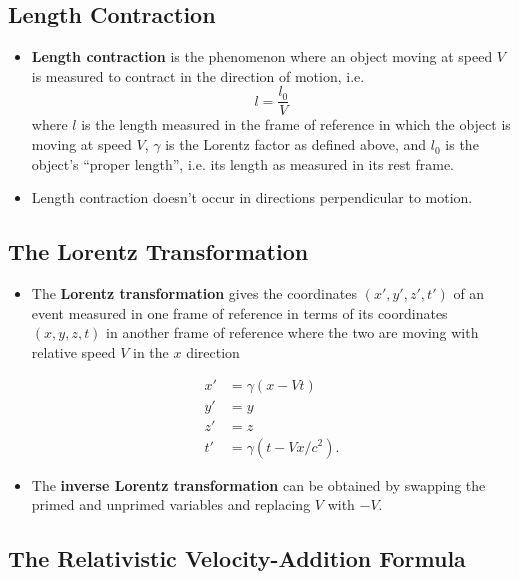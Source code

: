 \documentclass{article}
\begin{document}
\subsection{Length Contraction}

\begin{itemize}
  \item \textbf{Length contraction} is the phenomenon where an object moving at speed $V$ is measured to contract in the direction of motion, i.e. \[l = \frac{l_0}{V}\] where $l$ is the length measured in the frame of reference in which the object is moving at speed $V$, $\gamma$ is the Lorentz factor as defined above, and $l_0$ is the object's ``proper length'', i.e. its length as measured in its rest frame.

  \item Length contraction doesn't occur in directions perpendicular to motion.
\end{itemize}

\subsection{The Lorentz Transformation}

\begin{itemize}
  \item The \textbf{Lorentz transformation} gives the coordinates $(x', y', z', t')$ of an event measured in one frame of reference in terms of its coordinates $(x, y, z, t)$ in another frame of reference where the two are moving with relative speed $V$ in the $x$ direction

        \begin{align*}
          x' & = \gamma (x - V t)        \\
          y' & = y                       \\
          z' & = z                       \\
          t' & = \gamma (t - V x / c^2).
        \end{align*}

  \item The \textbf{inverse Lorentz transformation} can be obtained by swapping the primed and unprimed variables and replacing $V$ with $-V$.
\end{itemize}

\subsection{The Relativistic Velocity-Addition Formula}
\end{document}
